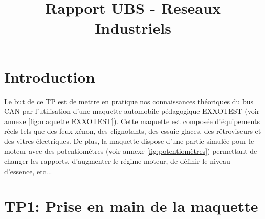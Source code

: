 \documentclass{rapportECC}
\title{Rapport UBS - Reseaux Industriels} %
\begin{document}





        
\fairemarges %
\fairepagedegarde %
\tabledematieres %



\section{Introduction} 

Le but de ce TP est de mettre en pratique nos connaissances théoriques du bus CAN par l'utilisation d'une maquette automobile pédagogique EXXOTEST (voir annexe \ref{fig:maquette EXXOTEST}). Cette maquette est composée d'équipements réels tels que des feux xénon, des clignotants, des essuie-glaces, des rétroviseurs et des vitres électriques. De plus, la maquette dispose d'une partie simulée pour le moteur avec des potentiomètres (voir annexe \ref{fig:potentiomètres}) permettant de changer les rapports, d'augmenter le régime moteur, de définir le niveau d'essence, etc...


\section{TP1: Prise en main de la maquette}

\end{document}
